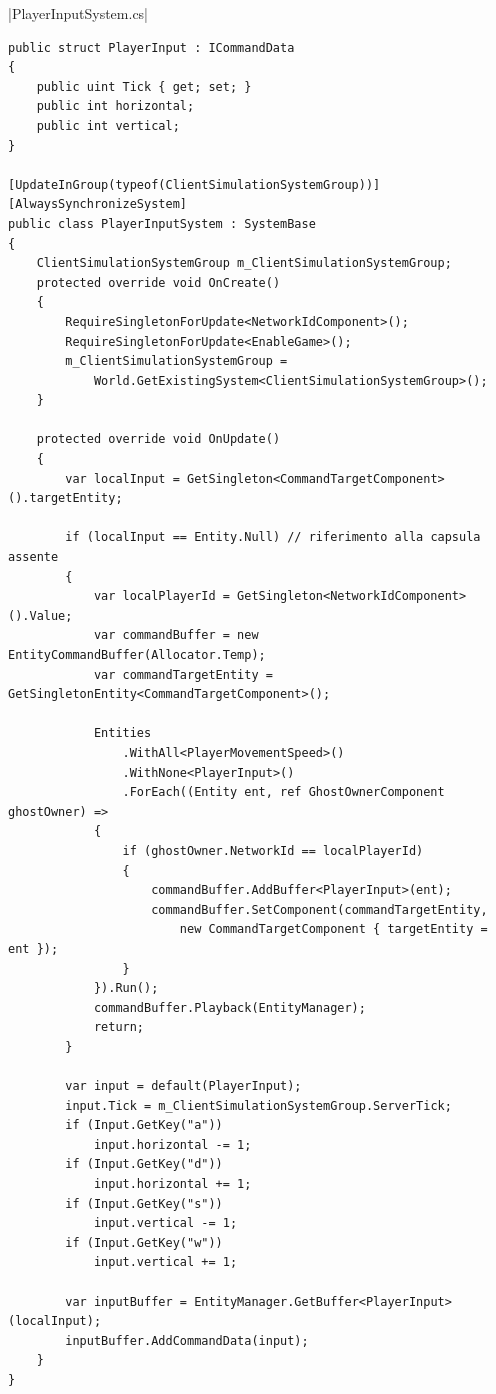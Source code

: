 |PlayerInputSystem.cs|

\begin{lstlisting}[caption={File \UseVerb{PlayerInputSystemTerm}: campionamento degli input del giocatore ed invio al server tramite stream di comandi bufferizzato.}, label={lst:prototipo-input-client}, language={[Sharp]C}]
public struct PlayerInput : ICommandData
{
    public uint Tick { get; set; }
    public int horizontal;
    public int vertical;
}

[UpdateInGroup(typeof(ClientSimulationSystemGroup))]
[AlwaysSynchronizeSystem]
public class PlayerInputSystem : SystemBase
{
    ClientSimulationSystemGroup m_ClientSimulationSystemGroup;
    protected override void OnCreate()
    {
        RequireSingletonForUpdate<NetworkIdComponent>();
        RequireSingletonForUpdate<EnableGame>();
        m_ClientSimulationSystemGroup =
            World.GetExistingSystem<ClientSimulationSystemGroup>();
    }

    protected override void OnUpdate()
    {
        var localInput = GetSingleton<CommandTargetComponent>().targetEntity;
        
		if (localInput == Entity.Null) // riferimento alla capsula assente
        {
			var localPlayerId = GetSingleton<NetworkIdComponent>().Value;
            var commandBuffer = new EntityCommandBuffer(Allocator.Temp);
            var commandTargetEntity = GetSingletonEntity<CommandTargetComponent>();
            
			Entities
			    .WithAll<PlayerMovementSpeed>()
			    .WithNone<PlayerInput>()
			    .ForEach((Entity ent, ref GhostOwnerComponent ghostOwner) =>
            {
				if (ghostOwner.NetworkId == localPlayerId)
                {
                    commandBuffer.AddBuffer<PlayerInput>(ent);
                    commandBuffer.SetComponent(commandTargetEntity, 
                        new CommandTargetComponent { targetEntity = ent });
                }
            }).Run();
            commandBuffer.Playback(EntityManager);
            return;
        }
        
		var input = default(PlayerInput);
		input.Tick = m_ClientSimulationSystemGroup.ServerTick;
        if (Input.GetKey("a"))
            input.horizontal -= 1;
        if (Input.GetKey("d"))
            input.horizontal += 1;
        if (Input.GetKey("s"))
            input.vertical -= 1;
        if (Input.GetKey("w"))
            input.vertical += 1;
        
        var inputBuffer = EntityManager.GetBuffer<PlayerInput>(localInput);
        inputBuffer.AddCommandData(input);
    }
}
\end{lstlisting}

